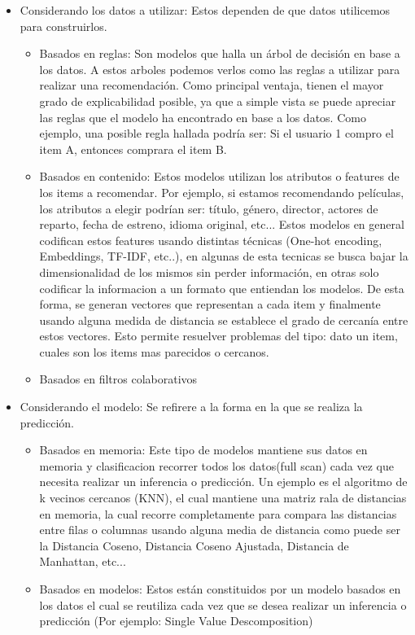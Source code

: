 \documentclass[11pt,a4paper,twoside]{tesis}
\begin{document}
\begin{itemize}
\item Considerando los datos a utilizar: Estos dependen de que datos utilicemos para construirlos.	
	\begin{itemize}
	\item Basados en reglas: Son modelos que halla un árbol de decisión en base a los datos. A estos arboles podemos verlos como las reglas a utilizar para realizar una recomendación. Como principal ventaja, tienen el mayor grado de explicabilidad posible,  ya que a simple vista se puede apreciar las reglas que el modelo ha encontrado en base a los datos. Como ejemplo, una posible regla hallada podría ser: Si el usuario 1 compro el item A, entonces comprara el item B.
	\item Basados en contenido:  Estos modelos utilizan los atributos o features de los items a recomendar. Por ejemplo, si estamos recomendando películas, los atributos a elegir podrían ser: título, género, director, actores de reparto, fecha de estreno, idioma original, etc... Estos modelos  en general codifican estos features usando distintas técnicas (One-hot encoding, Embeddings, TF-IDF, etc..), en algunas de esta tecnicas se busca bajar la dimensionalidad de los mismos sin perder información, en otras solo codificar la informacion a un formato que entiendan los modelos. 
De esta forma, se generan vectores que representan a cada item y finalmente usando alguna medida de distancia se establece el grado de cercanía entre estos vectores. Esto permite resuelver  problemas del tipo: dato un item, cuales son los items mas parecidos o cercanos.
	\item Basados en filtros colaborativos
\end{itemize}	


\item Considerando el modelo: Se refirere a la forma en la que se realiza la predicción.	
	\begin{itemize}
	\item Basados en memoria: Este tipo de modelos mantiene sus datos en memoria y clasificacion recorrer todos los datos(full scan) cada vez que necesita realizar un inferencia o predicción. Un ejemplo es el algoritmo de k vecinos cercanos (KNN), el cual mantiene una matriz rala de distancias en memoria, la cual recorre completamente para compara las distancias entre filas o columnas usando alguna media de distancia como puede ser la Distancia Coseno, Distancia Coseno Ajustada, Distancia de Manhattan, etc...
	\item Basados en modelos:  Estos están constituidos por un modelo basados en los datos el cual se reutiliza cada vez que se desea realizar un inferencia o predicción (Por ejemplo: Single Value Descomposition)
	\end{itemize}
\end{itemize}
\end{document}
